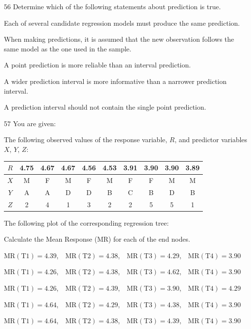 \begin{question}{56}
Determine which of the following statements about prediction is true.

\begin{choices}
\item Each of several candidate regression models must produce the same prediction.
\item When making predictions, it is assumed that the new observation follows the same model as the one used in the sample.
\item A point prediction is more reliable than an interval prediction.
\item A wider prediction interval is more informative than a narrower prediction interval.
\item A prediction interval should not contain the single point prediction.
\end{choices}
\end{question}
\begin{question}{57}
You are given:
\begin{given}
\item The following observed values of the response variable, $R$, and predictor variables $X$, $Y$, $Z$:
\begin{center}
\begin{tabular}{|c|c|c|c|c|c|c|c|c|c|}
\hline
$R$ & 4.75 & 4.67 & 4.67 & 4.56 & 4.53 & 3.91 & 3.90 & 3.90 & 3.89 \\ \hline
$X$ & M & F & M & F & M & F & F & M & M \\ \hline
$Y$ & A & A & D & D & B & C & B & D & B \\ \hline
$Z$ & 2 & 4 & 1 & 3 & 2 & 2 & 5 & 5 & 1 \\ \hline
\end{tabular}
\end{center}
\item The following plot of the corresponding regression tree:
\end{given}

Calculate the Mean Response (MR) for each of the end nodes.

\begin{choices}
\item $\mathrm{MR}(\mathrm{T1}) = 4.39$,\ \ $\mathrm{MR}(\mathrm{T2}) = 4.38$,\ \ $\mathrm{MR}(\mathrm{T3}) = 4.29$,\ \ $\mathrm{MR}(\mathrm{T4}) = 3.90$
\item $\mathrm{MR}(\mathrm{T1}) = 4.26$,\ \ $\mathrm{MR}(\mathrm{T2}) = 4.38$,\ \ $\mathrm{MR}(\mathrm{T3}) = 4.62$,\ \ $\mathrm{MR}(\mathrm{T4}) = 3.90$
\item $\mathrm{MR}(\mathrm{T1}) = 4.26$,\ \ $\mathrm{MR}(\mathrm{T2}) = 4.39$,\ \ $\mathrm{MR}(\mathrm{T3}) = 3.90$,\ \ $\mathrm{MR}(\mathrm{T4}) = 4.29$
\item $\mathrm{MR}(\mathrm{T1}) = 4.64$,\ \ $\mathrm{MR}(\mathrm{T2}) = 4.29$,\ \ $\mathrm{MR}(\mathrm{T3}) = 4.38$,\ \ $\mathrm{MR}(\mathrm{T4}) = 3.90$
\item $\mathrm{MR}(\mathrm{T1}) = 4.64$,\ \ $\mathrm{MR}(\mathrm{T2}) = 4.38$,\ \ $\mathrm{MR}(\mathrm{T3}) = 4.39$,\ \ $\mathrm{MR}(\mathrm{T4}) = 3.90$
\end{choices}
\end{question}

